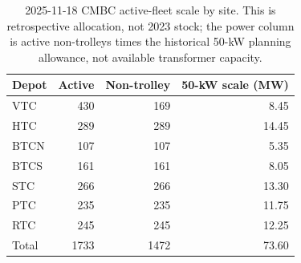 \begin{table}[htbp]
\centering
\begin{tabular}{@{}lrrr@{}}
\toprule
Depot & Active & Non-trolley & 50-kW scale (MW)\\ 
\midrule
VTC & 430 & 169 & 8.45\\
HTC & 289 & 289 & 14.45\\
BTCN & 107 & 107 & 5.35\\
BTCS & 161 & 161 & 8.05\\
STC & 266 & 266 & 13.30\\
PTC & 235 & 235 & 11.75\\
RTC & 245 & 245 & 12.25\\
\midrule
Total & 1733 & 1472 & 73.60\\
\bottomrule
\end{tabular}
\caption{2025-11-18 CMBC active-fleet scale by site. This is retrospective allocation, not 2023 stock; the power column is active non-trolleys times the historical 50-kW planning allowance, not available transformer capacity.}
\end{table}
